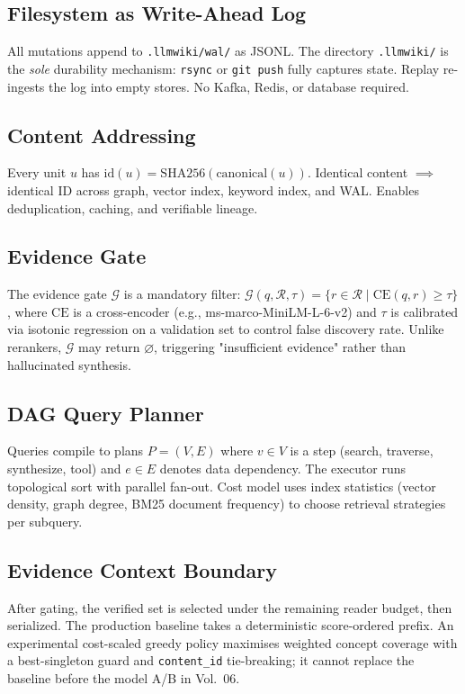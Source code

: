 \subsection{Filesystem as Write-Ahead Log}
All mutations append to \texttt{.llmwiki/wal/} as JSONL. The directory \texttt{.llmwiki/} is the \emph{sole} durability mechanism: \texttt{rsync} or \texttt{git push} fully captures state. Replay re-ingests the log into empty stores. No Kafka, Redis, or database required.

\subsection{Content Addressing}
Every unit $u$ has $\text{id}(u) = \text{SHA256}(\text{canonical}(u))$. Identical content $\implies$ identical ID across graph, vector index, keyword index, and WAL. Enables deduplication, caching, and verifiable lineage.

\subsection{Evidence Gate}
The evidence gate $\mathcal{G}$ is a mandatory filter: $\mathcal{G}(q, \mathcal{R}, \tau) = \{ r \in \mathcal{R} \mid \text{CE}(q, r) \geq \tau \}$, where $\text{CE}$ is a cross-encoder (e.g., ms-marco-MiniLM-L-6-v2) and $\tau$ is calibrated via isotonic regression on a validation set to control false discovery rate. Unlike rerankers, $\mathcal{G}$ may return $\varnothing$, triggering "insufficient evidence" rather than hallucinated synthesis.

\subsection{DAG Query Planner}
Queries compile to plans $P = (V, E)$ where $v \in V$ is a step (search, traverse, synthesize, tool) and $e \in E$ denotes data dependency. The executor runs topological sort with parallel fan-out. Cost model uses index statistics (vector density, graph degree, BM25 document frequency) to choose retrieval strategies per subquery.

\subsection{Evidence Context Boundary}
After gating, the verified set is selected under the remaining reader budget,
then serialized. The production baseline takes a deterministic score-ordered
prefix. An experimental cost-scaled greedy policy maximises weighted concept
coverage with a best-singleton guard and \texttt{content\_id} tie-breaking; it
cannot replace the baseline before the model A/B in Vol.~06.

